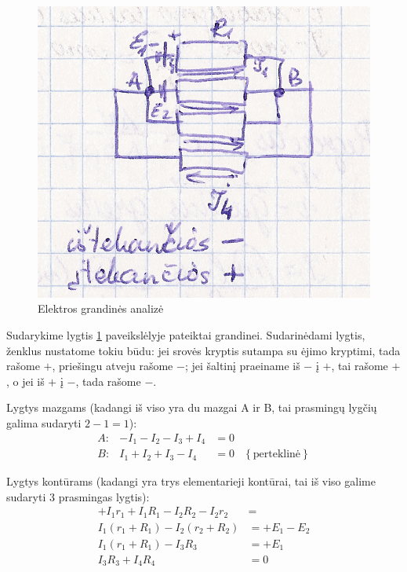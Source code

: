 \begin{figure}[H]
  \begin{center}
    \includegraphics[height=0.5\textwidth]{images/grandine1.png}
  \end{center}
  \caption{Elektros grandinės analizė}
  \label{fig:grandine1}
\end{figure}

\begin{exmp}
  Sudarykime lygtis \ref{fig:grandine1} paveikslėlyje pateiktai grandinei.
  Sudarinėdami lygtis, ženklus nustatome tokiu būdu: jei srovės kryptis
  sutampa su ėjimo kryptimi, tada rašome $+$, priešingu atveju rašome
  $-$; jei šaltinį praeiname iš $-$ į $+$, tai rašome $+$, o jei
  iš $+$ į $-$, tada rašome $-$.

  Lygtys mazgams (kadangi iš viso yra du mazgai A ir B, tai prasmingų
  lygčių galima sudaryti $2 - 1 = 1$):
  \begin{align*}
    A: & -I_{1} - I_{2} - I_{3} + I_{4} &= 0 \\
    B: & I_{1} + I_{2} + I_{3} - I_{4} &= 0 &
      \left\{ \text{perteklinė} \right\}
  \end{align*}
  
  Lygtys kontūrams (kadangi yra trys elementarieji kontūrai, tai iš
  viso galime sudaryti 3 prasmingas lygtis):
  \begin{align*}
    +I_{1}r_{1} + I_{1}R_{1} - I_{2}R_{2} - I_{2}r_{2} &= \\
      I_{1} (r_{1} + R_{1}) - I_{2} (r_{2} + R_{2}) &=
      + E_{1} - E_{2} \\
    I_{1} \left( r_{1} + R_{1} \right) - I_{3} R_{3} &= + E_{1} \\
    I_{3} R_{3} + I_{4} R_{4} &= 0
  \end{align*}
\end{exmp}

